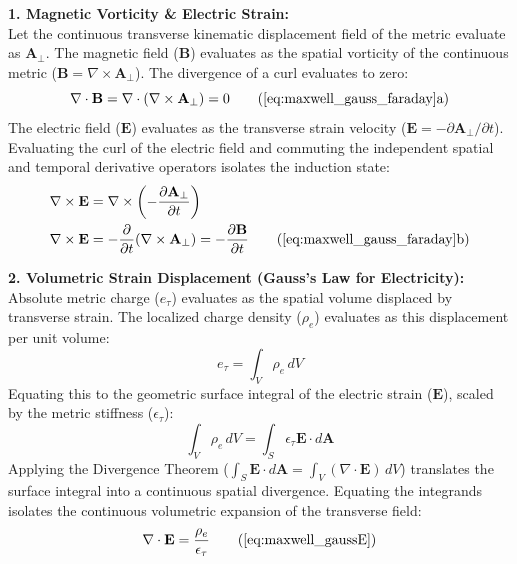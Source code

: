 \documentclass[11pt, a4paper]{article}
\begin{document}
\textbf{1. Magnetic Vorticity \& Electric Strain:} \\
Let the continuous transverse kinematic displacement field of the metric evaluate as $\mathbf{A}_{\perp}$. The magnetic field ($\mathbf{B}$) evaluates as the spatial vorticity of the continuous metric ($\mathbf{B} = \nabla \times \mathbf{A}_{\perp}$). The divergence of a curl evaluates to zero:
\begin{equation}
    \nabla \cdot \mathbf{B} = \nabla \cdot (\nabla \times \mathbf{A}_{\perp}) = 0 \tag{\ref{eq:maxwell_gauss_faraday}a}
\end{equation}
The electric field ($\mathbf{E}$) evaluates as the transverse strain velocity ($\mathbf{E} = -\partial \mathbf{A}_{\perp}/\partial t$). Evaluating the curl of the electric field and commuting the independent spatial and temporal derivative operators isolates the induction state:
\begin{align}
    \nabla \times \mathbf{E} &= \nabla \times \left(-\frac{\partial \mathbf{A}_{\perp}}{\partial t}\right) \nonumber \\
    \nabla \times \mathbf{E} &= -\frac{\partial}{\partial t}(\nabla \times \mathbf{A}_{\perp}) = -\frac{\partial \mathbf{B}}{\partial t} \tag{\ref{eq:maxwell_gauss_faraday}b}
\end{align}

\textbf{2. Volumetric Strain Displacement (Gauss's Law for Electricity):} \\
Absolute metric charge ($e_{\tau}$) evaluates as the spatial volume displaced by transverse strain. The localized charge density ($\rho_e$) evaluates as this displacement per unit volume:
\begin{equation}
    e_{\tau} = \int_V \rho_e \, dV
\end{equation}
Equating this to the geometric surface integral of the electric strain ($\mathbf{E}$), scaled by the metric stiffness ($\epsilon_{\tau}$):
\begin{equation}
    \int_V \rho_e \, dV = \int_S \epsilon_{\tau} \mathbf{E} \cdot d\mathbf{A}
\end{equation}
Applying the Divergence Theorem ($\int_S \mathbf{E} \cdot d\mathbf{A} = \int_V (\nabla \cdot \mathbf{E}) \, dV$) translates the surface integral into a continuous spatial divergence. Equating the integrands isolates the continuous volumetric expansion of the transverse field:
\begin{equation}
    \nabla \cdot \mathbf{E} = \frac{\rho_e}{\epsilon_{\tau}} \tag{\ref{eq:maxwell_gaussE}}
\end{equation}
\end{document}
